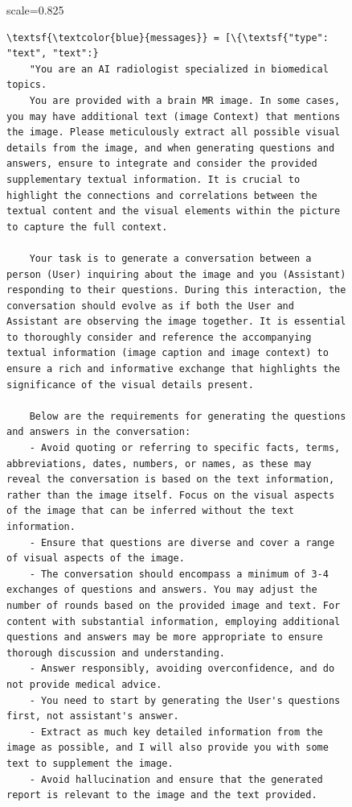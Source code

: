 \begin{figure}[t]
\centering
\begin{minipage}{1\linewidth}
    \begin{adjustbox}{scale=0.825}
    \begin{minipage}{1.2\columnwidth}
    \begin{Verbatim}[frame=single, numbersep=5pt,
                     commandchars=\\\{\}, breaklines=true,  
                     breaksymbolleft={}, breaksymbolright={}]
\textsf{\textcolor{blue}{messages}} = [\{\textsf{"type": "text", "text":} 
    "You are an AI radiologist specialized in biomedical topics.
    You are provided with a brain MR image. In some cases, you may have additional text (image Context) that mentions the image. Please meticulously extract all possible visual details from the image, and when generating questions and answers, ensure to integrate and consider the provided supplementary textual information. It is crucial to highlight the connections and correlations between the textual content and the visual elements within the picture to capture the full context.

    Your task is to generate a conversation between a person (User) inquiring about the image and you (Assistant) responding to their questions. During this interaction, the conversation should evolve as if both the User and Assistant are observing the image together. It is essential to thoroughly consider and reference the accompanying textual information (image caption and image context) to ensure a rich and informative exchange that highlights the significance of the visual details present.

    Below are the requirements for generating the questions and answers in the conversation:
    - Avoid quoting or referring to specific facts, terms, abbreviations, dates, numbers, or names, as these may reveal the conversation is based on the text information, rather than the image itself. Focus on the visual aspects of the image that can be inferred without the text information.
    - Ensure that questions are diverse and cover a range of visual aspects of the image.
    - The conversation should encompass a minimum of 3-4 exchanges of questions and answers. You may adjust the number of rounds based on the provided image and text. For content with substantial information, employing additional questions and answers may be more appropriate to ensure thorough discussion and understanding.
    - Answer responsibly, avoiding overconfidence, and do not provide medical advice. 
    - You need to start by generating the User's questions first, not assistant's answer.
    - Extract as much key detailed information from the image as possible, and I will also provide you with some text to supplement the image.
    - Avoid hallucination and ensure that the generated report is relevant to the image and the text provided.
    

\end{Verbatim}
\end{minipage}
\end{adjustbox}
\end{minipage}
\end{figure}
